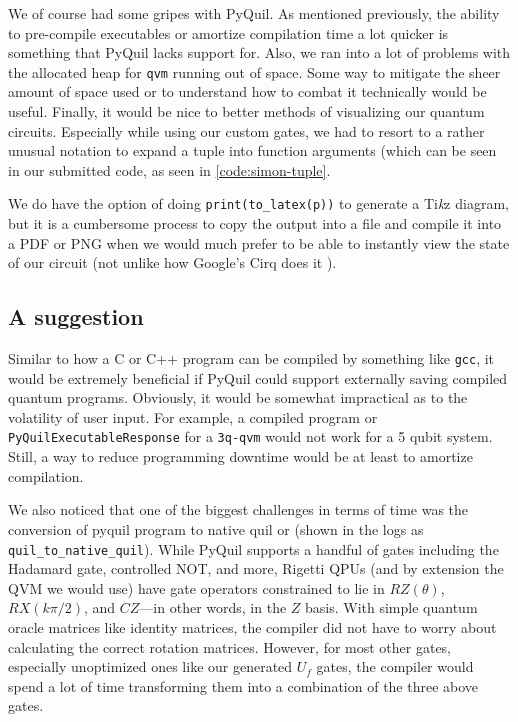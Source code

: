 \documentclass[12pt]{article}
\begin{document}
We of course had some gripes with PyQuil.
As mentioned previously, the ability to pre-compile executables or amortize compilation time a lot quicker is something that PyQuil lacks support for.
Also, we ran into a lot of problems with the allocated heap for \texttt{qvm} running out of space.
Some way to mitigate the sheer amount of space used or to understand how to combat it technically would be useful.
Finally, it would be nice to better methods of visualizing our quantum circuits.
Especially while using our custom gates, we had to resort to a rather unusual notation to expand a tuple into function arguments (which can be seen in our submitted code, as seen in \autoref{code:simon-tuple}.


We do have the option of doing \texttt{print(to\_latex(p))} to generate a Ti\textit{k}z diagram, but it is a cumbersome process to copy the output into a file and compile it into a PDF or PNG when we would much prefer to be able to instantly view the state of our circuit (not unlike how Google's Cirq does it \cite{cirq}).


\subsection{A suggestion}

Similar to how a C or C++ program can be compiled by something like \texttt{gcc}, it would be extremely beneficial if PyQuil could support externally saving compiled quantum programs.
Obviously, it would be somewhat impractical as to the volatility of user input.
For example, a compiled program or \texttt{PyQuilExecutableResponse} for a \texttt{3q-qvm} would not work for a 5 qubit system.
Still, a way to reduce programming downtime would be at least to amortize compilation.

We also noticed that one of the biggest challenges in terms of time was the conversion of pyquil program to native quil or (shown in the logs as \texttt{quil\_to\_native\_quil}).
While PyQuil supports a handful of gates including the Hadamard gate, controlled NOT, and more, Rigetti QPUs (and by extension the QVM we would use) have gate operators constrained to lie in $RZ(\theta)$, $RX(k\pi/2)$, and $CZ$---in other words, in the $Z$ basis.
With simple quantum oracle matrices like identity matrices, the compiler did not have to worry about calculating the correct rotation matrices.
However, for most other gates, especially unoptimized ones like our generated $U_f$ gates, the compiler would spend a lot of time transforming them into a combination of the three above gates.
\end{document}
